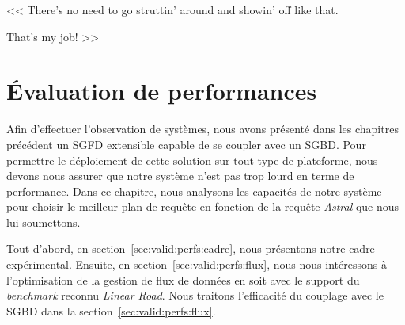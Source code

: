 \begin{savequote}[6cm]
<< There's no need to go struttin' around and showin' off like that. 

\quad That's my job! >>
\end{savequote}

\chapter{Évaluation de performances}\label{chap:valid:perfs}
\chaptertoc

Afin d'effectuer l'observation de systèmes, nous avons présenté dans les chapitres précédent un SGFD extensible capable de se coupler avec un SGBD. Pour permettre le déploiement de cette solution sur tout type de plateforme, nous devons nous assurer que notre système n'est pas trop lourd en terme de performance. Dans ce chapitre, nous analysons les capacités de notre système pour choisir le meilleur plan de requête en fonction de la requête \textit{Astral} que nous lui soumettons.

Tout d'abord, en section~\ref{sec:valid:perfs:cadre}, nous présentons notre cadre expérimental. Ensuite, en section~\ref{sec:valid:perfs:flux}, nous nous intéressons à l'optimisation de la gestion de flux de données en soit avec le support du \textit{benchmark} reconnu \textit{Linear Road}. Nous traitons l'efficacité du couplage avec le SGBD dans la section~\ref{sec:valid:perfs:flux}.





